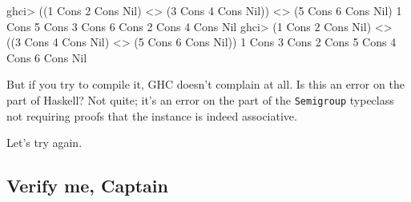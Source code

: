 \documentclass[]{article}
\newenvironment{Shaded}{}{}
\newcommand{\DataTypeTok}[1]{\textcolor[rgb]{0.56,0.13,0.00}{#1}}
\newcommand{\DecValTok}[1]{\textcolor[rgb]{0.25,0.63,0.44}{#1}}
\newcommand{\NormalTok}[1]{#1}
\newcommand{\OperatorTok}[1]{\textcolor[rgb]{0.40,0.40,0.40}{#1}}
\newcommand{\OtherTok}[1]{\textcolor[rgb]{0.00,0.44,0.13}{#1}}
\begin{document}
\begin{Shaded}
\begin{Highlighting}[]
\NormalTok{ghci}\OperatorTok{>}\NormalTok{ ((}\DecValTok{1} \OtherTok{\textasciigrave{}Cons\textasciigrave{}} \DecValTok{2} \OtherTok{\textasciigrave{}Cons\textasciigrave{}} \DataTypeTok{Nil}\NormalTok{) }\OperatorTok{<>}\NormalTok{ (}\DecValTok{3} \OtherTok{\textasciigrave{}Cons\textasciigrave{}} \DecValTok{4} \OtherTok{\textasciigrave{}Cons\textasciigrave{}} \DataTypeTok{Nil}\NormalTok{)) }\OperatorTok{<>}\NormalTok{ (}\DecValTok{5} \OtherTok{\textasciigrave{}Cons\textasciigrave{}} \DecValTok{6} \OtherTok{\textasciigrave{}Cons\textasciigrave{}} \DataTypeTok{Nil}\NormalTok{)}
\DecValTok{1} \OtherTok{\textasciigrave{}Cons\textasciigrave{}} \DecValTok{5} \OtherTok{\textasciigrave{}Cons\textasciigrave{}} \DecValTok{3} \OtherTok{\textasciigrave{}Cons\textasciigrave{}} \DecValTok{6} \OtherTok{\textasciigrave{}Cons\textasciigrave{}} \DecValTok{2} \OtherTok{\textasciigrave{}Cons\textasciigrave{}} \DecValTok{4} \OtherTok{\textasciigrave{}Cons\textasciigrave{}} \DataTypeTok{Nil}
\NormalTok{ghci}\OperatorTok{>}\NormalTok{ (}\DecValTok{1} \OtherTok{\textasciigrave{}Cons\textasciigrave{}} \DecValTok{2} \OtherTok{\textasciigrave{}Cons\textasciigrave{}} \DataTypeTok{Nil}\NormalTok{) }\OperatorTok{<>}\NormalTok{ ((}\DecValTok{3} \OtherTok{\textasciigrave{}Cons\textasciigrave{}} \DecValTok{4} \OtherTok{\textasciigrave{}Cons\textasciigrave{}} \DataTypeTok{Nil}\NormalTok{) }\OperatorTok{<>}\NormalTok{ (}\DecValTok{5} \OtherTok{\textasciigrave{}Cons\textasciigrave{}} \DecValTok{6} \OtherTok{\textasciigrave{}Cons\textasciigrave{}} \DataTypeTok{Nil}\NormalTok{))}
\DecValTok{1} \OtherTok{\textasciigrave{}Cons\textasciigrave{}} \DecValTok{3} \OtherTok{\textasciigrave{}Cons\textasciigrave{}} \DecValTok{2} \OtherTok{\textasciigrave{}Cons\textasciigrave{}} \DecValTok{5} \OtherTok{\textasciigrave{}Cons\textasciigrave{}} \DecValTok{4} \OtherTok{\textasciigrave{}Cons\textasciigrave{}} \DecValTok{6} \OtherTok{\textasciigrave{}Cons\textasciigrave{}} \DataTypeTok{Nil}
\end{Highlighting}
\end{Shaded}

But if you try to compile it, GHC doesn't complain at all. Is this an error on
the part of Haskell? Not quite; it's an error on the part of the
\texttt{Semigroup} typeclass not requiring proofs that the instance is indeed
associative.

Let's try again.

\hypertarget{verify-me-captain}{%
\subsection{Verify me, Captain}\label{verify-me-captain}}
\end{document}
